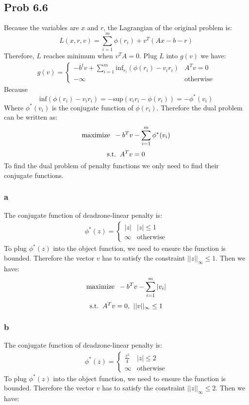 \documentclass[10pt,a4paper]{article}
\begin{document}
\subsection{Prob 6.6}
Because the variables are $x$ and $r$, the Lagrangian of the
original problem is:
$$
L(x,r,v) = \sum_{i=1}^{m}\phi(r_i)+v^T(Ax-b-r)
$$
Therefore, $L$ reaches minimum when $v^TA=0$. Plug $L$ into
$g(v)$ we have: 
\begin{align*}
  g(v)=
  \begin{cases}
    -b^tv+\sum_{i=1}^{m}\text{inf}_{r_i}(\phi(r_i)-v_ir_i) & A^Tv=0 \\
    -\infty & \text{otherwise}
  \end{cases}
\end{align*}
Because 
$$\text{inf}(\phi(r_i) - v_ir_i) = - \text{sup}(v_ir_i - \phi(r_i)) = -\phi^*(v_i)$$
Where $\phi^*(v_i)$ is the conjugate function of
$\phi(r_i)$. Therefore the dual problem can be written as:
$$\text{maximize\;\;} -b^Tv-\sum_{i=1}^{m}\phi^*(v_i)$$
$$\text{s.t.\;\;} A^Tv=0$$
To find the dual problem of penalty functions we only need
to find their conjugate functions.

\subsubsection{a}
The conjugate function of deadzone-linear penalty is:
\begin{align*}
  \phi^*(z) = 
  \begin{cases}
    |z| & |z|\leq 1\\
    \infty & \text{otherwise}
  \end{cases}
\end{align*}
To plug $\phi^*(z)$ into the object function, we need to
ensure the function is bounded. Therefore the vector $v$
has to satisfy the constraint $||z||_{\infty}\leq 1$. Then
we have:
$$\text{maximize\;\;} -b^Tv-\sum_{i=1}^{m}|v_i|$$
$$\text{s.t.\;\;} A^Tv=0\text{,\;\;} ||v||_{\infty}\leq 1$$
\subsubsection{b}
The conjugate function of deadzone-linear penalty is:
\begin{align*}
  \phi^*(z) = 
  \begin{cases}
    \frac{z^2}{4} & |z|\leq 2\\
    \infty & \text{otherwise}
  \end{cases}
\end{align*}
To plug $\phi^*(z)$ into the object function, we need to
ensure the function is bounded. Therefore the vector $v$
has to satisfy the constraint $||z||_{\infty}\leq 2$. Then
we have:
\end{document}
